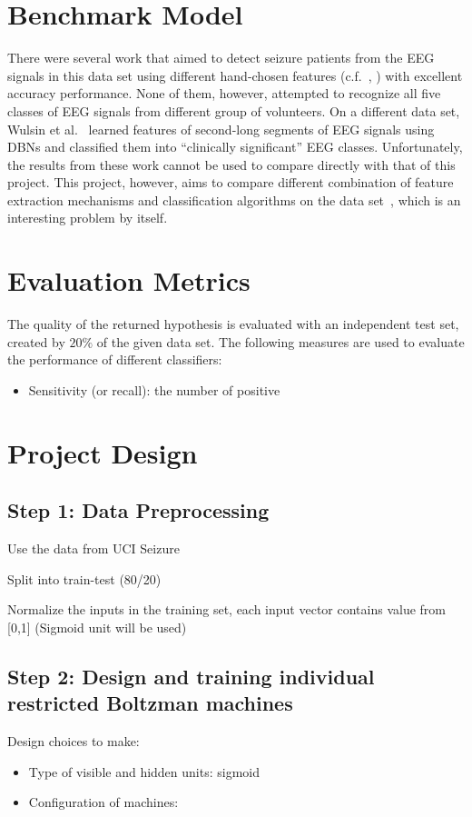 \documentclass[12pt]{article}
\begin{document}
\section{Benchmark Model}
\label{sec:benchmark}
There were several work that aimed to detect seizure patients from the EEG signals in this data set using different hand-chosen features (c.f.~\cite{nigam2004neural}, \cite{kabir2016epileptic}) with excellent accuracy performance. None of them, however, attempted to recognize all five classes of EEG signals from different group of volunteers. On a different data set, Wulsin et al.~\cite{wulsin2011modeling} learned features of second-long segments of EEG signals using DBNs and classified them into ``clinically significant'' EEG classes. Unfortunately, the results from these work cannot be used to compare directly with that of this project. This project, however, aims to compare different combination of feature extraction mechanisms and classification algorithms on the data set~\cite{andrzejak2001indications}, which is an interesting problem by itself.

\section{Evaluation Metrics}
\label{sec:metric}
The quality of the returned hypothesis is evaluated with an independent test set, created by $20\%$ of the given data set. The following measures are used to evaluate the performance of different classifiers:
\begin{itemize}
\item Sensitivity (or recall): the number of positive 
\end{itemize}


\section{Project Design}

\subsection{Step 1: Data Preprocessing}

Use the data from UCI Seizure~\cite{UCISeizure}

Split into train-test (80/20)

Normalize the inputs in the training set, each input vector contains value from [0,1] (Sigmoid unit will be used)

\subsection{Step 2: Design and training individual restricted Boltzman machines}

Design choices to make:
\begin{itemize}
\item Type of visible and hidden units: sigmoid
\item Configuration of machines: 
\end{itemize}



\end{document}
